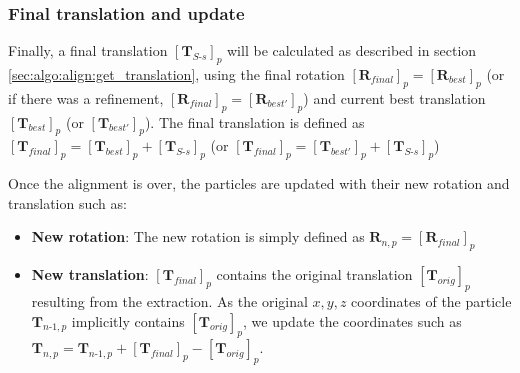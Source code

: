 \subsubsection{Final translation and update}

Finally, a final translation ${[\bm{T}_{S\text{-}s}]}_p$ will be calculated as described in section \ref{sec:algo:align:get_translation}, using the final rotation ${[\bm{R}_{final}]}_p = {[\bm{R}_{best}]}_p$ (or if there was a refinement, ${[\bm{R}_{final}]}_p = {[\bm{R}_{best'}]}_p$) and current best translation ${[\bm{T}_{best}]}_p$ (or ${[\bm{T}_{best'}]}_p$). The final translation is defined as ${[\bm{T}_{final}]}_p = {[\bm{T}_{best}]}_p + {[\bm{T}_{S\text{-}s}]}_p$ (or ${[\bm{T}_{final}]}_p = {[\bm{T}_{best'}]}_p + {[\bm{T}_{S\text{-}s}]}_p$)

Once the alignment is over, the particles are updated with their new rotation and translation such as:
\begin{itemize}
    \item \textbf{New rotation}: The new rotation is simply defined as $\bm{R}_{n,p} = {[\bm{R}_{final}]}_p$
    \item \textbf{New translation}: ${[\bm{T}_{final}]}_p$ contains the original translation ${[\bm{T}_{orig}]}_p$ resulting from the extraction. As the original $x,y,z$ coordinates of the particle $\bm{T}_{n\text{-}1,p}$ implicitly contains ${[\bm{T}_{orig}]}_p$, we update the coordinates such as $\bm{T}_{n,p} = \bm{T}_{n\text{-}1,p} + {[\bm{T}_{final}]}_p - {[\bm{T}_{orig}]}_p$.
\end{itemize}













